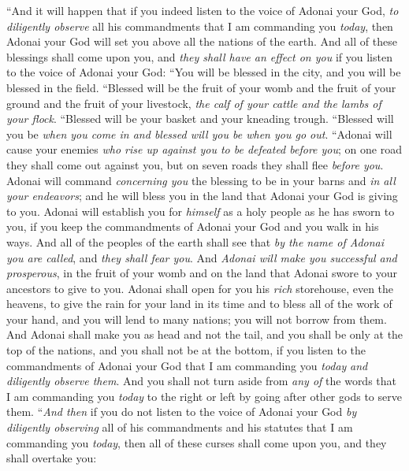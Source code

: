 \begin{biblechapter} %
\verse “And it will happen that if you indeed listen to the voice of Adonai your God, \textit{to diligently observe} all his commandments that I am commanding you \textit{today}, then Adonai your God will set you above all the nations of the earth.
\verse And all of these blessings shall come upon you, and \textit{they shall have an effect on you} if you listen to the voice of Adonai your God:
\verse “You will be blessed in the city, and you will be blessed in the field.
\verse “Blessed will be the fruit of your womb and the fruit of your ground and the fruit of your livestock, \textit{the calf of your cattle and the lambs of your flock}.
\verse “Blessed will be your basket and your kneading trough.
\verse “Blessed will you be \textit{when you come in and blessed will you be when you go out}.
\verse “Adonai will cause your enemies \textit{who rise up against you to be defeated before you}; on one road they shall come out against you, but on seven roads they shall flee \textit{before you}.
\verse Adonai will command \textit{concerning you} the blessing to be in your barns and \textit{in all your endeavors}; and he will bless you in the land that Adonai your God is giving to you.
\verse Adonai will establish you for \textit{himself} as a holy people as he has sworn to you, if you keep the commandments of Adonai your God and you walk in his ways.
\verse And all of the peoples of the earth shall see that \textit{by the name of Adonai you are called}, and \textit{they shall fear you}.
\verse And \textit{Adonai will make you successful and prosperous}, in the fruit of your womb and on the land that Adonai swore to your ancestors to give to you.
\verse Adonai shall open for you his \textit{rich} storehouse, even the heavens, to give the rain for your land in its time and to bless all of the work of your hand, and you will lend to many nations; you will not borrow from them.
\verse And Adonai shall make you as head and not the tail, and you shall be only at the top of the nations, and you shall not be at the bottom, if you listen to the commandments of Adonai your God that I am commanding you \textit{today} \textit{and diligently observe them}.
\verse And you shall not turn aside from \textit{any of} the words that I am commanding you \textit{today} to the right or left by going after other gods to serve them.
\verse “\textit{And then} if you do not listen to the voice of Adonai your God \textit{by diligently observing} all of his commandments and his statutes that I am commanding you \textit{today}, then all of these curses shall come upon you, and they shall overtake you:

\end{biblechapter}
